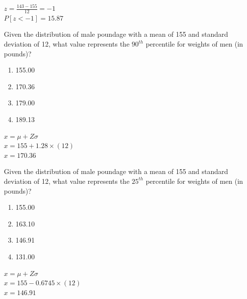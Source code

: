 \documentclass[11pt, chapterprefix=true]{scrbook}\usepackage[]{graphicx}\usepackage[]{color}
\begin{document}
\begin{exercises}
\begin{solution}
	    $z = \frac{143 - 155}{12} = -1$ \\
	    $P[z < -1] = 15.87$

	\end{solution}


  \begin{exercise} %

    Given the distribution of male poundage with a mean of 155 and standard deviation of 12, what value
represents the $90^{th}$ percentile for weights of men (in \\ pounds)?
	  \begin{enumerate}
	   \item 155.00
	  \item 170.36
	  \item 179.00
	  \item 189.13
	  \end{enumerate}
	  \vspace{5mm}
	\end{exercise}
	\vspace{2mm}
	\begin{solution}

	    $x = \mu + Z \sigma$ \\
	    $x = 155 + 1.28 \times (12) $ \\
	    $x = 170.36$

  \end{solution}

  \begin{exercise} %


    Given the distribution of male poundage with a mean of 155 and standard deviation of 12, what value
represents the $25^{th}$ percentile for weights of men (in \\ pounds)?
	  \begin{enumerate}
	   \item 155.00
	  \item 163.10
	  \item 146.91
	  \item 131.00
	  \end{enumerate}
	  \vspace{5mm}
	\end{exercise}
	\vspace{2mm}
	\begin{solution}

	    $x = \mu + Z \sigma$ \\
	    $x = 155 - 0.6745 \times (12) $ \\
	    $x = 146.91$


\end{solution}
\end{exercises}
\end{document}
